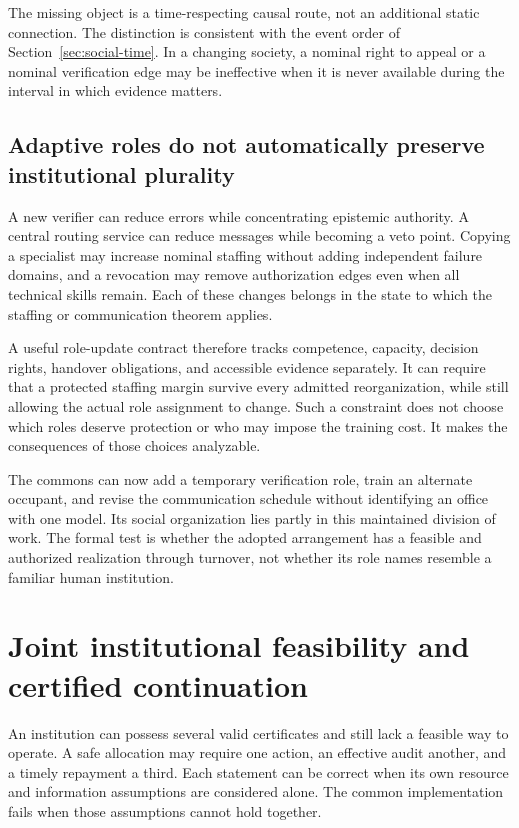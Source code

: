 \documentclass[11pt,letterpaper]{article}
\theoremstyle{plain}
\theoremstyle{definition}
\theoremstyle{remark}
\begin{document}
The missing object is a time-respecting causal route, not an additional static connection. The distinction is consistent with the event order of Section~\ref{sec:social-time}. In a changing society, a nominal right to appeal or a nominal verification edge may be ineffective when it is never available during the interval in which evidence matters.

\subsection{Adaptive roles do not automatically preserve institutional plurality}
A new verifier can reduce errors while concentrating epistemic authority. A central routing service can reduce messages while becoming a veto point. Copying a specialist may increase nominal staffing without adding independent failure domains, and a revocation may remove authorization edges even when all technical skills remain. Each of these changes belongs in the state to which the staffing or communication theorem applies.

A useful role-update contract therefore tracks competence, capacity, decision rights, handover obligations, and accessible evidence separately. It can require that a protected staffing margin survive every admitted reorganization, while still allowing the actual role assignment to change. Such a constraint does not choose which roles deserve protection or who may impose the training cost. It makes the consequences of those choices analyzable.

The commons can now add a temporary verification role, train an alternate occupant, and revise the communication schedule without identifying an office with one model. Its social organization lies partly in this maintained division of work. The formal test is whether the adopted arrangement has a feasible and authorized realization through turnover, not whether its role names resemble a familiar human institution.


\section{Joint institutional feasibility and certified continuation}\label{sec:joint-synthesis}
An institution can possess several valid certificates and still lack a feasible way to operate. A safe allocation may require one action, an effective audit another, and a timely repayment a third. Each statement can be correct when its own resource and information assumptions are considered alone. The common implementation fails when those assumptions cannot hold together.
\end{document}
